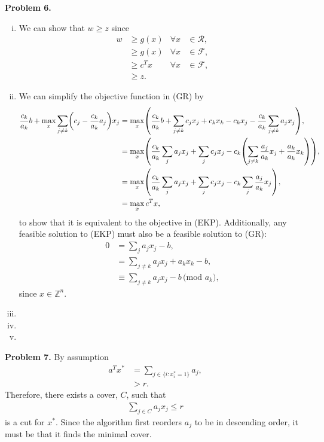 \documentclass[11pt,a4paper]{article}
\let\originalleft\left
\let\originalright\right
\renewcommand{\left}{\mathopen{}\mathclose\bgroup\originalleft}
\renewcommand{\right}{\aftergroup\egroup\originalright}
\begin{document}
\textbf{Problem 6.}

\begin{enumerate}[i)]
    \item We can show that $w \geq z$ since
    \begin{align*}
        w &\geq g(x) & \forall x &\in \mathscr{R}, \\
        &\geq g(x) & \forall x &\in \mathscr{F}, \\
        &\geq c^T x & \forall x &\in \mathscr{F}, \\
        &\geq z.
    \end{align*}
    \item We can simplify the objective function in (GR) by
    \begin{align*}
        \frac{c_k}{a_k} b + \max_x \sum_{j \ne k} \left( c_j - \frac{c_k}{a_k} a_j \right) x_j &=
            \max_x \left( \frac{c_k}{a_k} b + \sum_{j \ne k} c_j x_j + c_k x_k - c_k x_j - \frac{c_k}{a_k} \sum_{j \ne k} a_j x_j \right), \\
        &= \max_x \left( \frac{c_k}{a_k} \sum_j a_j x_j + \sum_j c_j x_j - c_k \left( \sum_{j \ne k} \frac{a_j}{a_k} x_j + \frac{a_k}{a_k} x_k \right) \right), \\
        &= \max_x \left( \frac{c_k}{a_k} \sum_j a_j x_j + \sum_j c_j x_j - c_k \sum_j \frac{a_j}{a_k} x_j \right), \\
        &= \max_x c^T x,
    \end{align*}
    to show that it is equivalent to the objective in (EKP). Additionally, any feasible solution to (EKP) must also be a feasible solution to (GR):
    \begin{align}
        0 &= \sum_j a_j x_j - b, \\
        &= \sum_{j \ne k} a_j x_j + a_k x_k - b, \\
        &\equiv \sum_{j \ne k} a_j x_j - b \, \text{(mod $a_k$)},
    \end{align}
    since $x \in \mathbb{Z}^n$.
    \item
    \item
    \item
\end{enumerate}

\textbf{Problem 7.}
By assumption
\begin{align}
    a^T x^* &= \sum_{j \in \{ i : x_i^* = 1 \}} a_j, \\
    &> r.
\end{align}
Therefore, there exists a cover, $C$, such that
\begin{align}
    \sum_{j \in C} a_j x_j \leq r
\end{align}
is a cut for $x^*$. Since the algorithm first reorders $a_j$ to be in descending order, it must be that it finds the minimal cover.
\end{document}
